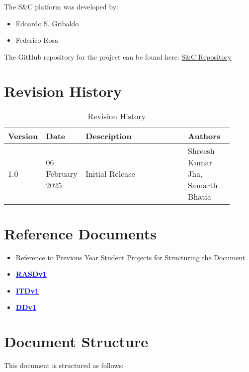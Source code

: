 The S\&C platform was developed by:
\begin{itemize}
    \item Edoardo S. Gribaldo
    \item Federico Rosa
\end{itemize}

The GitHub repository for the project can be found here: \href{https://github.com/edogriba/GribaldoRosa}{S\&C Repository}

\section{Revision History}
\label{sec:revision_history}

\begin{table}[H]
    \centering
    \begin{tabular}{ |p{0.1\linewidth}|p{0.15\linewidth}|p{0.45\linewidth}|p{0.2\linewidth}| }
        \hline
        \textbf{Version} & \textbf{Date} & \textbf{Description} & \textbf{Authors} \\
        \hline
        1.0 & 06 February 2025 & Initial Release & 
        Shreesh Kumar Jha, \newline
        Samarth Bhatia \\
        \hline
    \end{tabular}
    \caption{Revision History}
    \label{tab:revision_history}
\end{table}

\section{Reference Documents}
\label{sec:reference_documents}%
\begin{itemize}
    \item Reference to Previous Year Student Projects for Structuring the Document
    \item \href{https://github.com/edogriba/GribaldoRosa/blob/main/DeliveryFolder/RASDv1.pdf}{\textbf{\textcolor{blue}{\underline{RASDv1}}}}
    \item \href{https://github.com/edogriba/GribaldoRosa/blob/main/DeliveryFolder/ITDv1.pdf}{\textbf{\textcolor{blue}{\underline{ITDv1}}}}
    \item \href{https://github.com/edogriba/GribaldoRosa/blob/main/DeliveryFolder/DDv1.pdf}{\textbf{\textcolor{blue}{\underline{DDv1}}}}
\end{itemize}

\section{Document Structure}
\label{sec:document_structure}%
This document is structured as follows:

